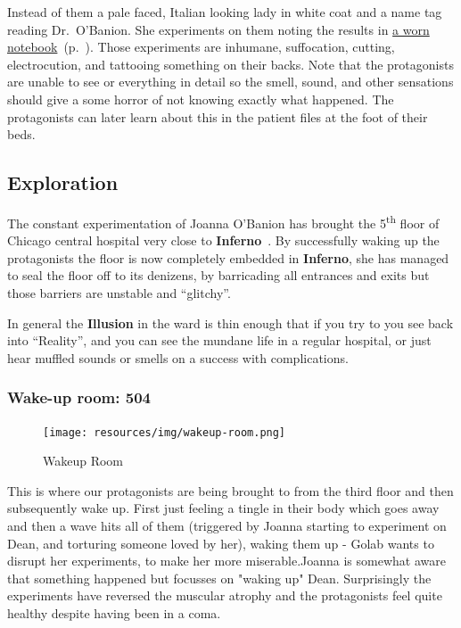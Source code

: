 Instead of them a pale faced, Italian looking lady in white coat and a name tag reading Dr.~O'Banion.  She experiments on them
noting the results in \hyperref[notebook]{a worn notebook}~(p.~\pageref{notebook}). Those experiments are inhumane, suffocation,
cutting, electrocution, and tattooing something on their backs. Note that the protagonists are unable to see or everything in
detail so the smell, sound, and other sensations should give a some horror of not knowing exactly what happened. The protagonists
can later learn about this in the patient files at the foot of their beds.

\subsection{Exploration}%
\label{sub:exploration}

The constant experimentation of Joanna O'Banion has brought the 5\textsuperscript{th} floor of Chicago
central hospital very close to \textbf{Inferno}~\cite[p.~314]{KULT:core}.  By successfully waking up the protagonists the floor
is now completely embedded in \textbf{Inferno}, she has managed to seal the floor off to its denizens, by barricading all
entrances and exits but those barriers are unstable and “glitchy”.

In general the \textbf{Illusion} in the ward is thin enough that if you try to  you see back
into “Reality”, and you can see the mundane life in a regular hospital, or just hear muffled sounds or smells on a success with
complications.

\subsubsection{Wake-up room: 504}%
\label{ssub:wake_up_room}

\begin{figure}[!htbp]
  \centering
  \texttt{[image: resources/img/wakeup-room.png]}%
  \caption{Wakeup Room}
\end{figure}

This is where our protagonists are being brought to from the third floor and then subsequently wake up. First just feeling a
tingle in their body which goes away and then a wave hits all of them (triggered by Joanna starting to experiment on Dean, and
torturing someone loved by her), waking them up - Golab wants to disrupt her experiments, to make her more miserable.Joanna is
somewhat aware that something happened but focusses on "waking up" Dean. Surprisingly the experiments have reversed the muscular
atrophy and the protagonists feel quite healthy despite having been in a coma.

